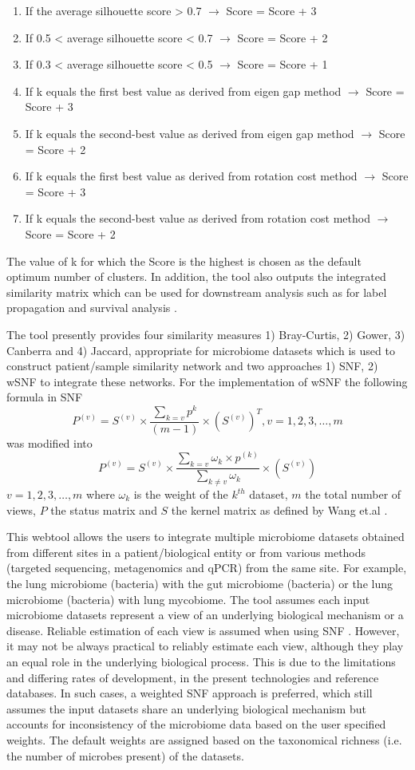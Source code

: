\begin{enumerate}
	\item If the average silhouette score > 0.7 $\rightarrow$ Score = Score + 3
	\item If 0.5 < average silhouette score < 0.7 $\rightarrow$ Score = Score + 2
	\item If 0.3 < average silhouette score < 0.5 $\rightarrow$ Score = Score + 1
	\item If k equals the first best value as derived from eigen gap method $\rightarrow$ Score = Score + 3
	\item If k equals the second-best value as derived from eigen gap method $\rightarrow$ Score = Score + 2
	\item If k equals the first best value as derived from rotation cost method $\rightarrow$ Score = Score + 3
	\item If k equals the second-best value as derived from rotation cost method $\rightarrow$ Score = Score + 2 
\end{enumerate} 
The value of k for which the Score is the highest is chosen as the default optimum number of clusters. In addition, the tool also outputs the integrated similarity matrix which can be used for downstream analysis such as for label propagation and survival analysis \cite{Wang2014}.

The tool presently provides four similarity measures 1) Bray-Curtis, 2) Gower, 3) Canberra and 4) Jaccard, appropriate for microbiome datasets which is used to construct patient/sample similarity network and two approaches 1) SNF, 2) wSNF to integrate these networks. For the implementation of wSNF the following formula in SNF
$$P^{(v)}=S^{(v)} \times \frac{\sum_{k=v} p^{k}}{(m-1)} \times (S^{(v)})^{T}, v=1,2,3, \ldots, m$$ was modified into $$P^{(v)}=S^{(v)} \times \frac{\sum_{k=v} \omega_{k} \times p^{(k)}}{\sum_{k \neq v} \omega_{k}} \times(S^{(v)})$$ $v=1,2,3, \ldots, m$
where $\omega_{k}$ is the weight of the $k^{ th}$ dataset, $m$ the total number of views, $P$ the status matrix and $S$ the kernel matrix as defined by Wang et.al \cite{Wang2014}.

This webtool allows the users to integrate multiple microbiome datasets obtained from different sites in a patient/biological entity or from various methods (targeted sequencing, metagenomics and qPCR) from the same site. For example, the lung microbiome (bacteria) with the gut microbiome (bacteria) or the lung microbiome (bacteria) with lung mycobiome. The tool assumes each input microbiome datasets represent a view of an underlying biological mechanism or a disease. Reliable estimation of each view is assumed when using SNF \cite{Jiang2019}. However, it may not be always practical to reliably estimate each view, although they play an equal role in the underlying biological process. This is due to the limitations and differing rates of development, in the present technologies and reference databases. In such cases, a weighted SNF approach is preferred, which still assumes the input datasets share an underlying biological mechanism but accounts for inconsistency of the microbiome data based on the user specified weights. The default weights are assigned based on the taxonomical richness (i.e. the number of microbes present) of the datasets. 

